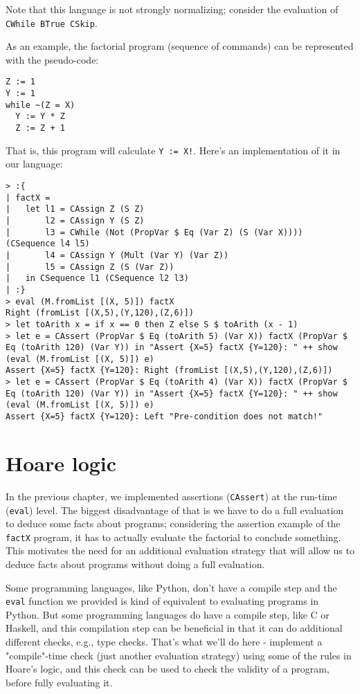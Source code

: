 \documentclass{article}
\begin{document}
Note that this language is not strongly normalizing; consider the evaluation of \texttt{CWhile BTrue CSkip}.

As an example, the factorial program (sequence of commands) can be represented with the pseudo-code:

\begin{lstlisting}
Z := 1
Y := 1
while ~(Z = X)
  Y := Y * Z
  Z := Z + 1
\end{lstlisting}

That is, this program will calculate \texttt{Y := X!}. Here's an implementation of it in our language:

\begin{lstlisting}
> :{
| factX =
|   let l1 = CAssign Z (S Z)
|       l2 = CAssign Y (S Z)
|       l3 = CWhile (Not (PropVar $ Eq (Var Z) (S (Var X)))) (CSequence l4 l5)
|       l4 = CAssign Y (Mult (Var Y) (Var Z))
|       l5 = CAssign Z (S (Var Z))
|   in CSequence l1 (CSequence l2 l3)
| :}
> eval (M.fromList [(X, 5)]) factX
Right (fromList [(X,5),(Y,120),(Z,6)])
> let toArith x = if x == 0 then Z else S $ toArith (x - 1)
> let e = CAssert (PropVar $ Eq (toArith 5) (Var X)) factX (PropVar $ Eq (toArith 120) (Var Y)) in "Assert {X=5} factX {Y=120}: " ++ show (eval (M.fromList [(X, 5)]) e)
Assert {X=5} factX {Y=120}: Right (fromList [(X,5),(Y,120),(Z,6)])
> let e = CAssert (PropVar $ Eq (toArith 4) (Var X)) factX (PropVar $ Eq (toArith 120) (Var Y)) in "Assert {X=5} factX {Y=120}: " ++ show (eval (M.fromList [(X, 5)]) e)
Assert {X=5} factX {Y=120}: Left "Pre-condition does not match!"
\end{lstlisting}

\section{Hoare logic}

In the previous chapter, we implemented assertions (\texttt{CAssert}) at the run-time (\texttt{eval}) level. The biggest disadvantage of that is we have to do a full evaluation to deduce some facts about programs; considering the assertion example of the \texttt{factX} program, it has to actually evaluate the factorial to conclude something. This motivates the need for an additional evaluation strategy that will allow us to deduce facts about programs without doing a full evaluation.

Some programming languages, like Python, don't have a compile step and the \texttt{eval} function we provided is kind of equivalent to evaluating programs in Python. But some programming languages do have a compile step, like C or Haskell, and this compilation step can be beneficial in that it can do additional different checks, e.g., type checks. That's what we'll do here - implement a "compile"-time check (just another evaluation strategy) using some of the rules in Hoare's logic, and this check can be used to check the validity of a program, before fully evaluating it.
\end{document}
